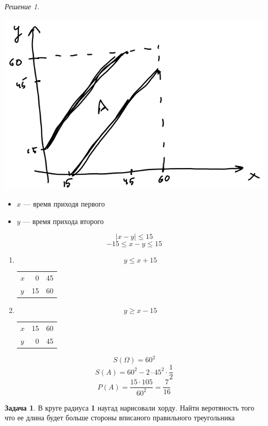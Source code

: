 \documentclass[english]{article}
\theoremstyle{plain}
\theoremstyle{remark}
\newtheorem*{solution}{Решение}
\theoremstyle{definition}
\newtheorem{task}{Задача}
\begin{document}
\begin{solution}
\-
\begin{center}
\includegraphics[scale=0.3]{2_2.png}
\end{center}
\begin{itemize}
\item \(x\) --- время приходя первого
\item \(y\) --- время прихода второго
\end{itemize}
\[ |x - y| \le 15 \]
\[ -15 \le x - y \le 15 \]
\begin{enumerate}
\item \[ y \le x + 15 \]
\begin{center}
\begin{tabular}{lrr}
\(x\) & 0 & 45\\
\(y\) & 15 & 60\\
\end{tabular}
\end{center}
\item \[ y \ge x - 15 \]
\begin{center}
\begin{tabular}{lrr}
\(x\) & 15 & 60\\
\(y\) & 0 & 45\\
\end{tabular}
\end{center}
\end{enumerate}
\[ S(\Omega) = 60^2 \]
\[ S(A) = 60^2 - 2\cdot45^2\cdot\frac{1}{2} \]
\[ P(A) = \frac{15\cdot105}{60^2} = \frac{7}{16} \]
\end{solution}
\begin{task}
В круге радиуса \textbf{1} наугад нарисовали хорду. Найти веротяность того
что ее длина будет больше стороны вписаного правильного треугольника
\end{task}
\end{document}
